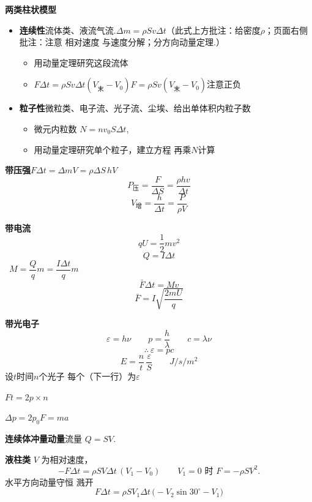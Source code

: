 \textbf{两类柱状模型}
\begin{itemize}
\item \textbf{连续性}\quad 流体类、液流气流.\quad $\Delta m=\rho Sv\Delta t$\quad （此式上方批注：给密度$\rho$；页面右侧批注：注意 相对速度 与速度分解；分方向动量定理.）
  \begin{itemize}
  \item 用动量定理研究这段流体
  \item $F\Delta t=\rho Sv\Delta t(V_{\text{末}}-V_0)$\qquad $F=\rho Sv(V_{\text{末}}-V_0)$\quad 注意正负
  \end{itemize}
\item \textbf{粒子性}\quad 微粒类、电子流、光子流、尘埃、给出单体积内粒子数
  \begin{itemize}
  \item 微元内粒数 $N=nv_0S\Delta t$,
  \item 用动量定理研究单个粒子，建立方程 再乘$N$计算
  \end{itemize}
\end{itemize}

\textbf{带压强}\quad $F\Delta t=\Delta mV=\rho\Delta S\,hV$
\[
P_{\text{压}}=\frac{F}{\Delta S}=\frac{\rho hv}{\Delta t}
\]
\[
V_{\text{增}}=\frac{h}{\Delta t}=\frac{P}{\rho V} %
\]

\textbf{带电流}
\[
qU=\frac{1}{2}mv^{2}
\]
\[
Q=I\Delta t
\]
\ $M=\dfrac{Q}{q}m=\dfrac{I\Delta t}{q}m$
\[
\bar F\Delta t=Mv
\]
\[
\bar F=I\sqrt{\frac{2mU}{q}}
\]

\textbf{带光电子} %
\[
\varepsilon=h\nu\qquad p=\frac{h}{\lambda}\qquad c=\lambda\nu
\]
\[
\therefore\ \varepsilon=pc
\]
\[
E=\frac{n}{t}\,\frac{\varepsilon}{S}\qquad \unit{J/s/m^{2}}
\]
设$t$时间$n$个光子 每个（下一行）为$\varepsilon$ %

\quad $Ft=2p\times n$

$\Delta p=2p_0$\quad $F=ma$

\textbf{连续体冲量动量}\quad 流量 $Q=SV$.

\textbf{液柱类}
$V$ 为相对速度，
\[
-F\Delta t=\rho SV\Delta t\,(V_1-V_0)\qquad V_1=0\text{ 时 }F=-\rho SV^2.
\]
水平方向动量守恒
溅开
\[
F\Delta t=\rho SV_1\Delta t\,\bigl(-V_2\sin30^\circ-V_1\bigr)
\]

